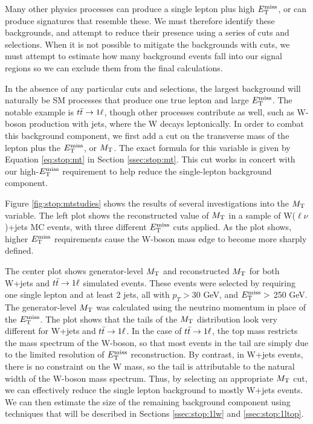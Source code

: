 Many other physics processes can produce a single lepton plus high
$E_\text{T}^\text{miss}$, or can produce signatures that resemble these. We must therefore
identify these backgrounds, and attempt to reduce their presence using
a series of cuts and selections. When it is not possible to mitigate
the backgrounds with cuts, we must attempt to estimate how many
background events fall into our signal regions so we can exclude them
from the final calculations.

In the absence of any particular cuts and selections, the largest
background will naturally be SM processes that produce one true lepton
and large $E_\text{T}^\text{miss}$. The notable example is $t\bar{t} \rightarrow 1\ell$,
though other processes contribute as well, such as W-boson production
with jets, where the W decays leptonically. In order to combat this
background component, we first add a cut on the transverse mass of the
lepton plus the $E_\text{T}^\text{miss}$, or $M_\text{T}$. The exact formula for this variable is
given by Equation \ref{eq:stop:mt} in Section \ref{ssec:stop:mt}. This cut works in
concert with our high-$E_\text{T}^\text{miss}$ requirement to help reduce the single-lepton
background component.


Figure \ref{fig:stop:mtstudies} shows the results of several
investigations into the $M_\text{T}$ variable. The left plot shows the
reconstructed value of $M_\text{T}$ in a sample of W($\ell\nu$)+jets MC
events, with three different $E_\text{T}^\text{miss}$ cuts applied. As the plot shows,
higher $E_\text{T}^\text{miss}$ requirements cause the W-boson mass edge to become more
sharply defined. %

The center plot shows generator-level $M_\text{T}$ and reconstructed $M_\text{T}$
for both W+jets and $t\bar{t} \rightarrow 1\ell$ simulated events. These
events were selected by requiring one single lepton and at least 2
jets, all with $p_T > 30$ GeV, and $E_\text{T}^\text{miss} >$ 250 GeV. The generator-level $M_\text{T}$ was
calculated using the neutrino momentum in place of the $E_\text{T}^\text{miss}$. The plot
shows that the tails of the $M_\text{T}$ distribution look very different for
W+jets and $t\bar{t} \rightarrow 1\ell$. In the case of $t\bar{t} \rightarrow 1\ell$, the top mass
restricts the mass spectrum of the W-boson, so that most events in the
tail are simply due to the limited resolution of $E_\text{T}^\text{miss}$
reconstruction. By contrast, in W+jets events, there is no constraint
on the W mass, so the tail is attributable to the natural width of the
W-boson mass spectrum. Thus, by selecting an appropriate $M_\text{T}$ cut, we
can effectively reduce the single lepton background to mostly W+jets
events. We can then estimate the size of the remaining background
component using techniques that will be described in Sections
\ref{ssec:stop:1lw} and \ref{ssec:stop:1ltop}. %

